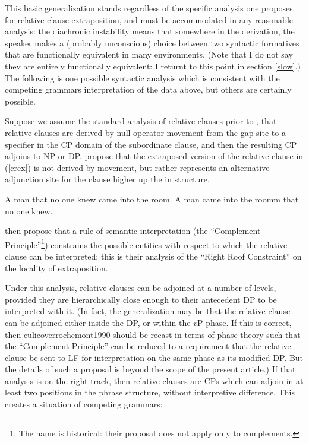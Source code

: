 This basic generalization stands regardless of the specific analysis one proposes for relative clause extraposition, and must be accommodated in any reasonable analysis: the diachronic instability means that somewhere in the derivation, the speaker makes a (probably unconscious) choice between two syntactic formatives that are functionally equivalent in many environments. (Note that I do not say they are entirely functionally equivalent: I returnt to this point in section \ref{slow}.) The following is one possible syntactic analysis which is consistent with the competing grammars interpretation of the data above, but others are certainly possible.

Suppose we assume the standard analysis of relative clauses prior to \citet{kayne1994} , that relative clauses are derived by null operator movement from the gap site to a specifier in the CP domain of the subordinate clause, and then the resulting CP adjoins to NP or DP. \citet{culicoverrochemont1990} propose that the extraposed version of the relative clause in (\ref{crex}) is not derived by movement, but rather represents an alternative adjunction site for the clause higher up the in structure.

\begin{exe}
    \ex \begin{xlist}
         \ex \label{crinsitu} A man that no one knew came into the room.
         \ex \label{crex} A man came into the roomm that no one knew.
         \end{xlist}
         \citep[][23]{culicoverrochemont1990}
\end{exe}

\noindent \citet{culicoverrochement1990} then propose that a rule of semantic interpretation (the ``Complement Principle''\footnote{The name is historical: their proposal does not apply only to complements.}) constrains the possible entities with respect to which the relative clause can be interpreted; this is their analysis of the ``Right Roof Constraint'' on the locality of extraposition.

Under this analysis, relative clauses can be adjoined at a number of levels, provided they are hierarchically close enough to their antecedent DP to be interpreted with it. (In fact, the generalization may be that the relative clause can be adjoined either inside the DP, or within the $v$P phase. If this is correct, then {culicoverrochemont1990} should be recast in terms of phase theory such that the ``Complement Principle'' can be reduced to a requirement that the relative clause be sent to LF for interpretation on the same phase as its modified DP. But the details of such a proposal is beyond the scope of the present article.) If that analysis is on the right track, then relative clauses are CPs which can adjoin in at least two positions in the phrase structure, without interpretive difference. This creates a situation of competing grammars: 

